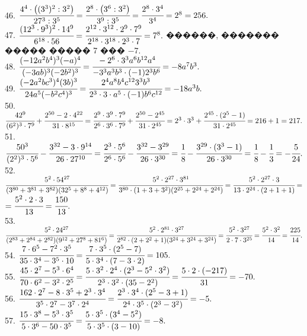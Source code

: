 \documentclass[12pt]{article}
\begin{document}
46. $\cfrac{4^4\cdot\left((3^3)^2: 3^2\right)}{27^3:3^5}=\cfrac{2^8\cdot\left(3^6:3^2\right)}{3^9:3^5}=
\cfrac{2^8\cdot3^4}{3^4}=2^8=256.$\\
47. $\cfrac{(12^3\cdot9^3)^2\cdot14^9}{6^{18}\cdot56}=\cfrac{2^{12}\cdot3^{12}\cdot2^9\cdot7^9}{2^{18}\cdot3^{18}\cdot2^3\cdot7}=7^8.$ ������, ������� ����� ����� 7 ��� $-7.$\\
48. $\cfrac{(-12a^2b^4)^3(-a)^4}{(-3ab)^3(-2b^2)^3}=\cfrac{-2^6\cdot 3^3 a^6 b^{12}a^4}{-3^3 a^3 b^3\cdot(-1)2^3 b^6}=-8a^7b^3.$\\
49. $\cfrac{(-2a^2bc^3)^4(3b)^3}{24a^5(-b^2c^4)^3}=\cfrac{2^4 a^8 b^4 c^{12}3^3 b^3}{2^3\cdot 3 \cdot a^5\cdot(-1)b^6c^{12}}=-18a^3b.$\\
50. $\cfrac{42^9}{(6^2)^3\cdot7^9}+\cfrac{2^{50}-2\cdot4^{22}}{31\cdot8^{15}}=\cfrac{2^9\cdot3^9\cdot7^9}{2^6\cdot3^6\cdot7^9}+\cfrac{2^{50}-2^{45}}{31\cdot2^{45}}=
2^3\cdot3^3+\cfrac{2^{45}\cdot(2^5-1)}{31\cdot2^{45}}=216+1=217.$\\
51. $\cfrac{50^3}{(2^2)^3\cdot5^6}-\cfrac{3^{32}-3\cdot9^{14}}{26\cdot27^{10}}=\cfrac{2^3\cdot5^6}{2^6\cdot5^6}-\cfrac{3^{32}-3^{29}}{26\cdot3^{30}}=
\cfrac{1}{8}-\cfrac{3^{29}\cdot(3^3-1)}{26\cdot3^{30}}=\cfrac{1}{8}-\cfrac{1}{3}=-\cfrac{5}{24}.$\\
52. $\cfrac{5^2\cdot54^{27}}{(3^{80}+3^{81}+3^{82})(32^5+8^8+4^{12})}=\cfrac{5^2\cdot2^{27}\cdot3^{81}}{3^{80}\cdot(1+3+3^2)(2^{25}+2^{24}+2^{24})}=
\cfrac{5^2\cdot2^{27}\cdot3}{13\cdot2^{24}\cdot(2+1+1)}=$\\$=\cfrac{5^2\cdot2\cdot3}{13}=\cfrac{150}{13}.$\\
53. $\cfrac{5^2\cdot24^{27}}{(2^{83}+2^{84}+2^{82})(9^{12}+27^8+81^{6})}=\cfrac{5^2\cdot2^{81}\cdot3^{27}}{2^{82}\cdot(2+2^2+1)(3^{24}+3^{24}+3^{24})}=
\cfrac{5^2\cdot3^{27}}{2\cdot7\cdot3^{25}}=\cfrac{5^2\cdot3^2}{14}=\cfrac{225}{14}.$\\
54. $\cfrac{7\cdot6^5-7^2\cdot3^5}{35\cdot3^4-3^5\cdot10}=
\cfrac{7\cdot3^5\cdot(2^5-7)}{5\cdot3^4\cdot(7-3\cdot2)}=105.$\\
55. $\cfrac{45\cdot2^7-5^3\cdot6^4}{70\cdot6^2-3^2\cdot2^5}=
\cfrac{5\cdot3^2\cdot2^4\cdot(2^3-5^2\cdot3^2)}{2^3\cdot3^2\cdot(35-2^2)}=
\cfrac{5\cdot2\cdot(-217)}{31}=-70.$\\
56. $\cfrac{162\cdot2^7-8\cdot3^5+2^3\cdot3^4}{3^5\cdot2^7-3^7\cdot2^4}=
\cfrac{2^3\cdot3^4\cdot(2^5-3+1)}{2^4\cdot3^5\cdot(2^3-3^2)}=-5.$\\
57. $\cfrac{15\cdot3^8-5^3\cdot3^5}{5\cdot3^6-50\cdot3^5}=
\cfrac{5\cdot3^5\cdot(3^4-5^2)}{5\cdot3^5\cdot(3-10)}=-8.$\\
\end{document}
